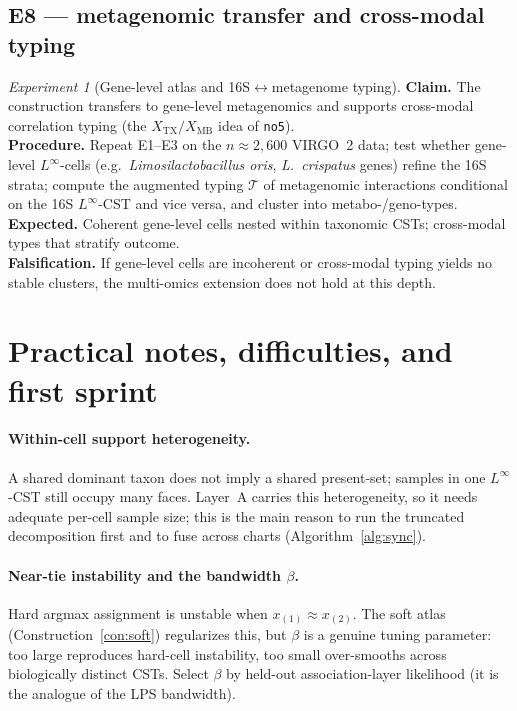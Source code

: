 \documentclass[11pt]{article}
\theoremstyle{definition}
\theoremstyle{plain}
\theoremstyle{remark}
\newtheorem{experiment}{Experiment}
\newcommand{\Linf}{L^{\infty}}
\newcommand{\1}{\mathbf{1}}
\begin{document}
\subsection{E8 --- metagenomic transfer and cross-modal typing}
\begin{experiment}[Gene-level atlas and 16S$\leftrightarrow$metagenome typing]\label{exp:mg}
\textbf{Claim.} The construction transfers to gene-level metagenomics and
supports cross-modal correlation typing (the $X_{\mathrm{TX}}/X_{\mathrm{MB}}$
idea of \texttt{no5}).\\
\textbf{Procedure.} Repeat E1--E3 on the $n\approx2{,}600$ VIRGO~2 data; test
whether gene-level $\Linf$-cells (e.g.\ \emph{Limosilactobacillus oris},
\emph{L.\ crispatus} genes) refine the 16S strata; compute the augmented typing
$\mathcal{T}$ of metagenomic interactions conditional on the 16S $\Linf$-CST and
vice versa, and cluster into metabo-/geno-types.\\
\textbf{Expected.} Coherent gene-level cells nested within taxonomic CSTs;
cross-modal types that stratify outcome.\\
\textbf{Falsification.} If gene-level cells are incoherent or cross-modal typing
yields no stable clusters, the multi-omics extension does not hold at this depth.
\end{experiment}

\section{Practical notes, difficulties, and first sprint}\label{sec:notes}

\paragraph{Within-cell support heterogeneity.} A shared dominant taxon does not
imply a shared present-set; samples in one $\Linf$-CST still occupy many faces.
Layer~A carries this heterogeneity, so it needs adequate per-cell sample size;
this is the main reason to run the truncated decomposition first and to fuse
across charts (Algorithm~\ref{alg:sync}).

\paragraph{Near-tie instability and the bandwidth $\beta$.} Hard argmax
assignment is unstable when $x_{(1)}\approx x_{(2)}$. The soft atlas
(Construction~\ref{con:soft}) regularizes this, but $\beta$ is a genuine tuning
parameter: too large reproduces hard-cell instability, too small over-smooths
across biologically distinct CSTs. Select $\beta$ by held-out association-layer
likelihood (it is the analogue of the LPS bandwidth).
\end{document}
